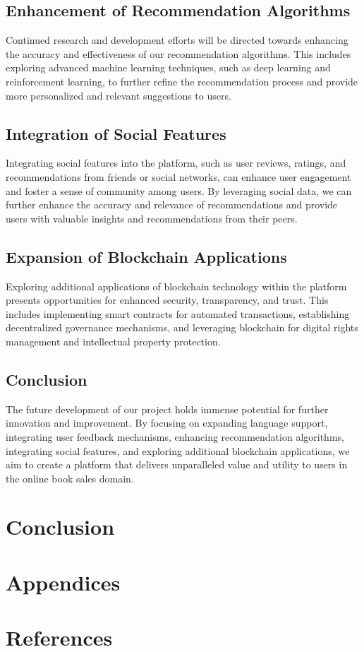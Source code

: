 \documentclass{article}
\begin{document}
\subsection{Enhancement of Recommendation Algorithms}

Continued research and development efforts will be directed towards enhancing the accuracy and effectiveness of our recommendation algorithms. This includes exploring advanced machine learning techniques, such as deep learning and reinforcement learning, to further refine the recommendation process and provide more personalized and relevant suggestions to users.

\subsection{Integration of Social Features}

Integrating social features into the platform, such as user reviews, ratings, and recommendations from friends or social networks, can enhance user engagement and foster a sense of community among users. By leveraging social data, we can further enhance the accuracy and relevance of recommendations and provide users with valuable insights and recommendations from their peers.

\subsection{Expansion of Blockchain Applications}

Exploring additional applications of blockchain technology within the platform presents opportunities for enhanced security, transparency, and trust. This includes implementing smart contracts for automated transactions, establishing decentralized governance mechanisms, and leveraging blockchain for digital rights management and intellectual property protection.

\subsection{Conclusion}

The future development of our project holds immense potential for further innovation and improvement. By focusing on expanding language support, integrating user feedback mechanisms, enhancing recommendation algorithms, integrating social features, and exploring additional blockchain applications, we aim to create a platform that delivers unparalleled value and utility to users in the online book sales domain.


\section{Conclusion}

\section{Appendices}

\section{References}
\end{document}
